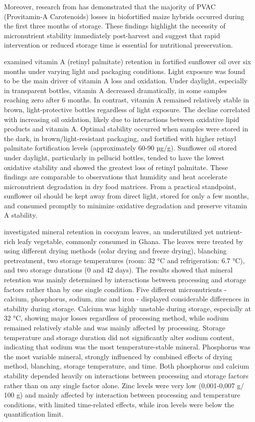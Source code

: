 Moreover, research from \citet{dutta} has demonstrated that the majority of PVAC (Provitamin-A Carotenoids) losses in biofortified maize hybrids occurred during the first three months of storage. These findings highlight the necessity of micronutrient stability immediately post-harvest and suggest that rapid intervention or reduced storage time is essential for nutritional preservation.
\par 
\citet{li4daylight} examined vitamin A (retinyl palmitate) retention in fortified sunflower oil over six months under varying light and packaging conditions. Light exposure was found to be the main driver of vitamin A loss and oxidation. Under daylight, especially in transparent bottles, vitamin A decreased dramatically, in some samples reaching zero after 6 months. In contrast, vitamin A remained relatively stable in brown, light-protective bottles regardless of light exposure. The decline correlated with increasing oil oxidation, likely due to interactions between oxidative lipid products and vitamin A. Optimal stability occurred when samples were stored in the dark, in brown/light-resistant packaging, and fortified with higher retinyl palmitate fortification levels (approximately 60-90 µg/g). Sunflower oil stored under daylight, particularly in pellucid bottles, tended to have the lowest oxidative stability and showed the greatest loss of retinyl palmitate. These findings are comparable to observations that humidity and heat accelerate micronutrient degradation in dry food matrices.
From a practical standpoint, sunflower oil should be kept away from direct light, stored for only a few months, and consumed promptly to minimize oxidative degradation and preserve vitamin A stability. \par 
\citet{li5cocoyam} investigated mineral retention in cocoyam leaves, an underutilized yet nutrient-rich leafy vegetable, commonly consumed in Ghana. The leaves were treated by using different drying methods (solar drying and freeze drying), blanching pretreatment, two storage temperatures (room: 32 °C and refrigeration: 6.7 °C), and two storage durations (0 and 42 days). The results showed that mineral retention was mainly determined by interactions between processing and storage factors rather than by one single condition. Five different micronutrients - calcium, phosphorus, sodium, zinc and iron - displayed considerable differences in stability during storage. 
Calcium was highly unstable during storage, especially at 32 °C, showing major losses regardless of processing method, while sodium remained relatively stable and was mainly affected by processing. Storage temperature and storage duration did not significantly alter sodium content, indicating that sodium was the most temperature-stable mineral. Phosphorus was the most variable mineral, strongly influenced by combined effects of drying method, blanching, storage temperature, and time. Both phosphorus and calcium stability depended heavily on interactions between processing and storage factors rather than on any single factor alone. Zinc levels were very low (0,001-0,007 g/ 100 g) and mainly affected by interaction between processing and temperature conditions, with limited time-related effects, while iron levels were below the quantification limit. 
